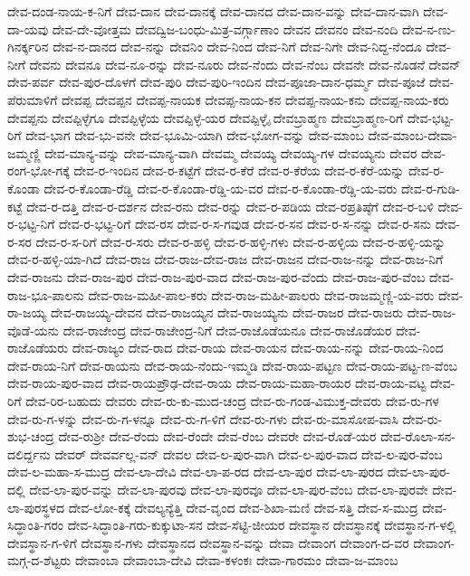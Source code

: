 ದೇವ-ದಂಡ-ನಾಯ-ಕ-ನಿಗೆ
ದೇವ-ದಾನ
ದೇವ-ದಾನಕ್ಕೆ
ದೇವ-ದಾನದ
ದೇವ-ದಾನ-ವನ್ನು
ದೇವ-ದಾನ-ವಾಗಿ
ದೇವ-ದಾ-ಯವು
ದೇವ-ದೇ-ವೋತ್ತಮ
ದೇವದ್ವಿಜ-ಬಂಧು-ಮಿತ್ರ-ವರ್ಗ್ಗಾಣಾಂ
ದೇವನ
ದೇವನಂ
ದೇವ-ನಂದಿ
ದೇವ-ನ-ಣು-ಗಿನರ್ಕ್ಕರಿನ
ದೇವ-ನ-ದಾನದ
ದೇವ-ನನ್ನು
ದೇವನಿಂ
ದೇವ-ನಿಂದ
ದೇವ-ನಿಗೆ
ದೇವ-ನಿಗೇ
ದೇವ-ನಿದ್ದ-ನೆಂದೂ
ದೇವ-ನೀಗೆ
ದೇವನು
ದೇವನೂ
ದೇವ-ನೂ-ರನ್ನು
ದೇವ-ನೂರು
ದೇವ-ನೆಂದು
ದೇವ-ನೆಂಬ
ದೇವನೇ
ದೇವ-ನೊಡನೆ
ದೇವನ್
ದೇವ-ಪರ್ವ
ದೇವ-ಪುರ-ದೊಳಗೆ
ದೇವ-ಪುರಿ
ದೇವ-ಪುರಿ-ಇಂದಿನ
ದೇವ-ಪೂಜಾ-ದಾನ-ಧರ್ಮ್ಮ
ದೇವ-ಪೂಜೆ
ದೇವ-ಪೆರುಮಾಳಿಗೆ
ದೇವಪ್ಪ
ದೇವಪ್ಪನ
ದೇವಪ್ಪ-ನಾಯಕ
ದೇವಪ್ಪ-ನಾಯ-ಕನ
ದೇವಪ್ಪ-ನಾಯ-ಕನು
ದೇವಪ್ಪ-ನಾಯ-ಕರು
ದೇವಪ್ಪನು
ದೇವಪ್ಪಿಳ್ಳೆಗೂ
ದೇವಪ್ಪಿಳ್ಳೆಯ
ದೇವಪ್ಪಿಳ್ಳೆ-ಯರ
ದೇವಪ್ಪಿಳ್ಳೈ
ದೇವಬ್ರಾಹ್ಮಣ
ದೇವಬ್ರಾಹ್ಮಣ-ರಿಗೆ
ದೇವ-ಭಟ್ಟ-ರಿಗೆ
ದೇವ-ಭಾಗ
ದೇವ-ಭು-ವನೇ
ದೇವ-ಭೂಮಿ-ಯಾಗಿ
ದೇವ-ಭೋಗ-ವನ್ನು
ದೇವ-ಮಾಂಬ
ದೇವ-ಮಾಂಬ-ದೇವಾ-ಜಮ್ಮಣ್ಣಿ
ದೇವ-ಮಾನ್ಯ-ವನ್ನು
ದೇವ-ಮಾನ್ಯ-ವಾಗಿ
ದೇವಮ್ಮ
ದೇವಯ್ಯ
ದೇವಯ್ಯ-ಗಳ
ದೇವಯ್ಯನು
ದೇವರ
ದೇವ-ರಂಗ-ಭೋ-ಗಕ್ಕೆ
ದೇವ-ರ-ಇಂದಿನ
ದೇವ-ರ-ಕಟ್ಟೆಗೆ
ದೇವ-ರ-ಕೆರೆ
ದೇವ-ರ-ಕೆರೆಯ
ದೇವ-ರ-ಕೆರೆ-ಯನ್ನು
ದೇವ-ರ-ಕೊಂಡಾ
ದೇವ-ರ-ಕೊಂಡಾ-ರೆಡ್ಡಿ
ದೇವ-ರ-ಕೊಂಡಾ-ರೆಡ್ಡಿ-ಯ-ವರ
ದೇವ-ರ-ಕೊಂಡಾ-ರೆಡ್ಡಿ-ಯ-ವರು
ದೇವ-ರ-ಗುಡಿ-ಕಟ್ಟೆ
ದೇವ-ರ-ದತ್ತಿ
ದೇವ-ರ-ದರ್ಶನ
ದೇವ-ರನು
ದೇವ-ರನ್ನು
ದೇವ-ರ-ಪಡಿಯ
ದೇವ-ರಪ್ರತಿಷ್ಠೆಗೆ
ದೇವ-ರ-ಬಳಿ
ದೇವ-ರ-ಭಟ್ಟ-ನಿಗೆ
ದೇವ-ರ-ಭಟ್ಟ-ರಿಗೆ
ದೇವ-ರಸ
ದೇವ-ರ-ಸ-ಗವುಡ
ದೇವ-ರ-ಸನ
ದೇವ-ರ-ಸ-ನನ್ನು
ದೇವ-ರ-ಸನು
ದೇವ-ರ-ಸರ
ದೇವ-ರ-ಸ-ರಿಗೆ
ದೇವ-ರ-ಸರು
ದೇವ-ರ-ಹಳ್ಳಿ
ದೇವ-ರ-ಹಳ್ಳಿ-ಗಳು
ದೇವ-ರ-ಹಳ್ಳಿಯ
ದೇವ-ರ-ಹಳ್ಳಿ-ಯನ್ನು
ದೇವ-ರ-ಹಳ್ಳಿ-ಯಾ-ಗಿದೆ
ದೇವ-ರಾಜ
ದೇವ-ರಾಜ-ದೇವ-ರಾಜ
ದೇವ-ರಾಜನ
ದೇವ-ರಾಜ-ನನ್ನು
ದೇವ-ರಾಜ-ನಿಗೆ
ದೇವ-ರಾಜನು
ದೇವ-ರಾಜ-ಪುರ
ದೇವ-ರಾಜ-ಪುರ-ವಾದ
ದೇವ-ರಾಜ-ಪುರ-ವೆಂದು
ದೇವ-ರಾಜ-ಪುರ-ವೆಂಬ
ದೇವ-ರಾಜ-ಭೂ-ಪಾಲನು
ದೇವ-ರಾಜ-ಮಹೀ-ಪಾಲ-ಕರು
ದೇವ-ರಾಜ-ಮಹೀ-ಪಾಲರು
ದೇವ-ರಾಜಮ್ಮಣ್ಣಿ-ಯ-ವರು
ದೇವ-ರಾ-ಜಯ್ಯ
ದೇವ-ರಾಜಯ್ಯ-ದೇವನ
ದೇವ-ರಾಜಯ್ಯನ
ದೇವ-ರಾಜಯ್ಯನು
ದೇವ-ರಾಜರ
ದೇವ-ರಾಜರು
ದೇವ-ರಾಜ-ವೊಡೆ-ಯನು
ದೇವ-ರಾಜೇಂದ್ರ
ದೇವ-ರಾಜೇಂದ್ರ-ನಿಗೆ
ದೇವ-ರಾಜೊಡೆಯನೂ
ದೇವ-ರಾಜೊಡೆಯರ
ದೇವ-ರಾಜೊಡೆಯರು
ದೇವ-ರಾಜ್ಯಂ
ದೇವ-ರಾದ
ದೇವ-ರಾಯ
ದೇವ-ರಾಯನ
ದೇವ-ರಾಯ-ನನ್ನು
ದೇವ-ರಾಯ-ನಿಂದ
ದೇವ-ರಾಯ-ನಿಗೆ
ದೇವ-ರಾಯನು
ದೇವ-ರಾಯ-ನೆಂದು-ಇಮ್ಮಡಿ
ದೇವ-ರಾಯ-ಪಟ್ಟಣ
ದೇವ-ರಾಯ-ಪಟ್ಟ-ಣ-ವೆಂಬ
ದೇವ-ರಾಯ-ಪುರ-ವಾದ
ದೇವ-ರಾಯಪ್ರೌಢ-ದೇವ-ರಾಯ
ದೇವ-ರಾಯ-ಮಹಾ-ರಾಯರ
ದೇವ-ರಾಯ-ವಟ್ಟ
ದೇವ-ರಿಗೆ
ದೇವ-ರಿರ-ಬಹುದು
ದೇವರು
ದೇವ-ರು-ಕು-ಮುದ-ಚಂದ್ರ
ದೇವ-ರು-ಗಂಡ-ವಿಮುಕ್ತ-ದೇವರು
ದೇವ-ರು-ಗಳ
ದೇವ-ರು-ಗ-ಳನ್ನು
ದೇವ-ರು-ಗ-ಳನ್ನೂ
ದೇವ-ರು-ಗ-ಳಿಗೆ
ದೇವ-ರು-ಗಳು
ದೇವ-ರು-ಮಾಸೋಪ-ವಾಸಿ
ದೇವ-ರು-ಶುಭ-ಚಂದ್ರ
ದೇವ-ರುಶ್ರೀ
ದೇವ-ರೆಂದು
ದೇವ-ರೆಂದೇ
ದೇವ-ರೆಂಬ
ದೇವರೇ
ದೇವ-ರೊಡೆ-ಯರ
ದೇವ-ರೊಲಾ-ಸನ-ದಲಿರ್ದ್ದನು
ದೇವರ್
ದೇವರ್ವಲ್ಲ-ವನ್
ದೇವಲ
ದೇವ-ಲ-ಪುರ-ವಾಗಿ
ದೇವ-ಲ-ಪುರ-ವಾದ
ದೇವ-ಲ-ಪುರ-ವೆಂಬ
ದೇವ-ಲ-ಮಹಾ-ಸ-ಮುದ್ರ
ದೇವ-ಲಾ-ದೇವಿ
ದೇವ-ಲಾ-ಪ-ರದ
ದೇವ-ಲಾ-ಪುರ
ದೇವ-ಲಾ-ಪುರದ
ದೇವ-ಲಾ-ಪುರ-ದಲ್ಲಿ
ದೇವ-ಲಾ-ಪುರ-ವನ್ನು
ದೇವ-ಲಾ-ಪುರವು
ದೇವ-ಲಾ-ಪುರವೂ
ದೇವ-ಲಾ-ಪುರ-ವೆಂಬ
ದೇವ-ಲಾ-ಪುರವೇ
ದೇವ-ಲಾ-ಪುರಸ್ಥಳದ
ದೇವ-ಲೋ-ಕಕ್ಕೆ
ದೇವಲ್ಯನ್ಯೆತ್ತಿ
ದೇವ-ವೃಂದ
ದೇವ-ಶಿಖಾ-ಮಣಿ
ದೇವ-ಸತ್ತಿ
ದೇವ-ಸ-ಮುದ್ರ
ದೇವ-ಸಿದ್ಧಾಂತಿ-ಗರಂ
ದೇವ-ಸಿದ್ಧಾಂತಿ-ಗರು-ಕುಕ್ಕುಟಾ-ಸನ
ದೇವ-ಸೆಟ್ಟಿ-ಜೀಯರ
ದೇವಸ್ಥಾನ
ದೇವಸ್ಥಾನಕ್ಕೆ
ದೇವಸ್ಥಾನ-ಗ-ಳಲ್ಲಿ
ದೇವಸ್ಥಾನ-ಗ-ಳಿಗೆ
ದೇವಸ್ಥಾನ-ಗಳು
ದೇವಸ್ಥಾನದ
ದೇವಸ್ಥಾನ-ವನ್ನು
ದೇವಾ
ದೇವಾಂಗ
ದೇವಾಂಗ-ದ-ವರ
ದೇವಾಂಗ-ಮಗ್ಗ-ದ-ಶೆಟ್ಟರು
ದೇವಾಂಬಾ
ದೇವಾಂಬಾ-ದೇವಿ
ದೇವಾ-ಕಳಂಕಃ
ದೇವಾ-ಗಾರಮಂ
ದೇವಾ-ಜ-ಮಾಂಬ
